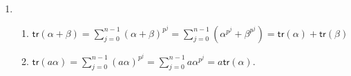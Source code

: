 \documentclass[12pt]{article}
\begin{document}
\begin{enumerate}
\item %
\begin{enumerate}
\item $\mathsf{tr}\left(\alpha+\beta\right)
=\sum_{j=0}^{n-1}\left(\alpha+\beta\right)^{p^j}
=\sum_{j=0}^{n-1}\left(\alpha^{p^j}+\beta^{p^j}\right)
=\mathsf{tr}\left(\alpha\right)+\mathsf{tr}\left(\beta\right)$
\item $\mathsf{tr}\left(a\alpha\right)
=\sum_{j=0}^{n-1}\left(a\alpha\right)^{p^j}
=\sum_{j=0}^{n-1}a\alpha^{p^j}=a\mathsf{tr}\left(\alpha\right)$.
\end{enumerate}

\end{enumerate}
\end{document}
